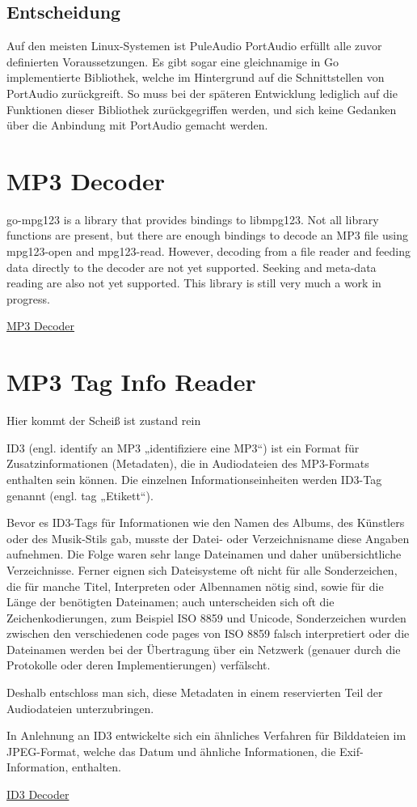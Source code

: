 \subsection{Entscheidung}
Auf den meisten Linux-Systemen ist PuleAudio
PortAudio erfüllt alle zuvor definierten Voraussetzungen. Es gibt sogar eine
gleichnamige in Go implementierte Bibliothek, welche im Hintergrund auf die
Schnittstellen von PortAudio zurückgreift. So muss bei der späteren Entwicklung
lediglich auf die Funktionen dieser Bibliothek zurückgegriffen werden, und sich
keine Gedanken über die Anbindung mit PortAudio gemacht werden. 

\section{MP3 Decoder}
go-mpg123 is a library that provides bindings to libmpg123.
Not all library functions are present, but there are enough bindings to decode an MP3 file using mpg123-open and mpg123-read. However, decoding from a file reader and feeding data directly to the decoder are not yet supported. Seeking and meta-data reading are also not yet supported.
This library is still very much a work in progress.

\href{https://github.com/bobertlo/go-mpg123}{MP3 Decoder}

\section{MP3 Tag Info Reader}
Hier kommt der Scheiß ist zustand rein

ID3 (engl. identify an MP3 „identifiziere eine MP3“) ist ein Format für Zusatzinformationen (Metadaten), die in Audiodateien des MP3-Formats enthalten sein können. Die einzelnen Informationseinheiten werden ID3-Tag genannt (engl. tag „Etikett“).

Bevor es ID3-Tags für Informationen wie den Namen des Albums, des Künstlers oder des Musik-Stils gab, musste der Datei- oder Verzeichnisname diese Angaben aufnehmen. Die Folge waren sehr lange Dateinamen und daher unübersichtliche Verzeichnisse. Ferner eignen sich Dateisysteme oft nicht für alle Sonderzeichen, die für manche Titel, Interpreten oder Albennamen nötig sind, sowie für die Länge der benötigten Dateinamen; auch unterscheiden sich oft die Zeichenkodierungen, zum Beispiel ISO 8859 und Unicode, Sonderzeichen wurden zwischen den verschiedenen code pages von ISO 8859 falsch interpretiert oder die Dateinamen werden bei der Übertragung über ein Netzwerk (genauer durch die Protokolle oder deren Implementierungen) verfälscht.

Deshalb entschloss man sich, diese Metadaten in einem reservierten Teil der Audiodateien unterzubringen.

In Anlehnung an ID3 entwickelte sich ein ähnliches Verfahren für Bilddateien im JPEG-Format, welche das Datum und ähnliche Informationen, die Exif-Information, enthalten.

\href{https://github.com/mikkyang/id3-go}{ID3 Decoder}
